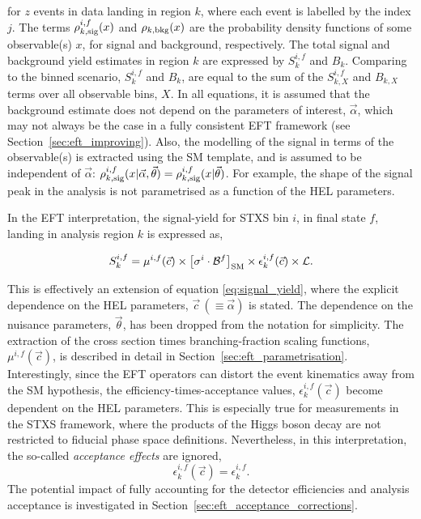 \noindent
for $z$ events in data landing in region $k$, where each event is labelled by the index $j$. The terms $\rho^{i,f}_{k,{\rm{sig}}}(x)$ and $\rho_{k,{\rm{bkg}}}(x)$ are the probability density functions of some observable(s) $x$, for signal and background, respectively. The total signal and background yield estimates in region $k$ are expressed by $S^{i,f}_{k}$ and $B_{k}$. Comparing to the binned scenario, $S^{i,f}_{k}$ and $B_{k}$, are equal to the sum of the $S^{i,f}_{k,X}$ and $B_{k,X}$ terms over all observable bins, $X$. In all equations, it is assumed that the background estimate does not depend on the parameters of interest, $\vec{\alpha}$, which may not always be the case in a fully consistent EFT framework (see Section~\ref{sec:eft_improving}). Also, the modelling of the signal in terms of the observable(s) is extracted using the SM template, and is assumed to be independent of $\vec{\alpha}$: $\rho^{i,f}_{k,{\rm{sig}}}(x|\vec{\alpha},\vec{\theta})=\rho^{i,f}_{k,{\rm{sig}}}(x|\vec{\theta})$. For example, the shape of the signal \mgg peak in the \Hgg analysis is not parametrised as a function of the HEL parameters.

In the EFT interpretation, the signal-yield for STXS bin $i$, in final state $f$, landing in analysis region $k$ is expressed as, 

\begin{equation}\label{eq:signal_yield_eft}
    S_k^{i,f} = \mu^{i,f}(\vec{c}) \times \big[\sigma^i \cdot \mathcal{B}^{f} \big]_{\rm{SM}} \times \epsilon^{i,f}_k(\vec{c}) \times \mathcal{L}.
\end{equation}

\noindent
This is effectively an extension of equation \ref{eq:signal_yield}, where the explicit dependence on the HEL parameters, $\vec{c}\,(\equiv\vec{\alpha})$ is stated. The dependence on the nuisance parameters, $\vec{\theta}$, has been dropped from the notation for simplicity. The extraction of the cross section times branching-fraction scaling functions, $\mu^{i,f}(\vec{c})$, is described in detail in Section~\ref{sec:eft_parametrisation}. Interestingly, since the EFT operators can distort the event kinematics away from the SM hypothesis, the efficiency-times-acceptance values, $\epsilon^{i,f}_k(\vec{c})$ become dependent on the HEL parameters. This is especially true for measurements in the STXS framework, where the products of the Higgs boson decay are not restricted to fiducial phase space definitions. Nevertheless, in this interpretation, the so-called \textit{acceptance effects} are ignored,
\begin{equation}
   \epsilon^{i,f}_k(\vec{c})=\epsilon^{i,f}_k. 
\end{equation}
The potential impact of fully accounting for the detector efficiencies and analysis acceptance is investigated in Section~\ref{sec:eft_acceptance_corrections}.

